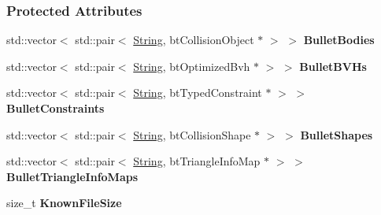 \subsubsection*{Protected Attributes}
\begin{DoxyCompactItemize}
\item 
\hypertarget{classphys_1_1internal_1_1BulletFile_aa06c20e012deb7f7cae320d97104334e}{
std::vector$<$ std::pair$<$ \hyperlink{namespacephys_aa03900411993de7fbfec4789bc1d392e}{String}, btCollisionObject $\ast$ $>$ $>$ {\bfseries BulletBodies}}
\label{classphys_1_1internal_1_1BulletFile_aa06c20e012deb7f7cae320d97104334e}

\item 
\hypertarget{classphys_1_1internal_1_1BulletFile_a6effca8b3d75b4253e1fa2f9557d381a}{
std::vector$<$ std::pair$<$ \hyperlink{namespacephys_aa03900411993de7fbfec4789bc1d392e}{String}, btOptimizedBvh $\ast$ $>$ $>$ {\bfseries BulletBVHs}}
\label{classphys_1_1internal_1_1BulletFile_a6effca8b3d75b4253e1fa2f9557d381a}

\item 
\hypertarget{classphys_1_1internal_1_1BulletFile_a9735286a72dcdc0885d72db07e2ba3a0}{
std::vector$<$ std::pair$<$ \hyperlink{namespacephys_aa03900411993de7fbfec4789bc1d392e}{String}, btTypedConstraint $\ast$ $>$ $>$ {\bfseries BulletConstraints}}
\label{classphys_1_1internal_1_1BulletFile_a9735286a72dcdc0885d72db07e2ba3a0}

\item 
\hypertarget{classphys_1_1internal_1_1BulletFile_a27074c0ada2979754653110d53c70d8f}{
std::vector$<$ std::pair$<$ \hyperlink{namespacephys_aa03900411993de7fbfec4789bc1d392e}{String}, btCollisionShape $\ast$ $>$ $>$ {\bfseries BulletShapes}}
\label{classphys_1_1internal_1_1BulletFile_a27074c0ada2979754653110d53c70d8f}

\item 
\hypertarget{classphys_1_1internal_1_1BulletFile_ae5f52ca26360b6f1143a46999255b6f2}{
std::vector$<$ std::pair$<$ \hyperlink{namespacephys_aa03900411993de7fbfec4789bc1d392e}{String}, btTriangleInfoMap $\ast$ $>$ $>$ {\bfseries BulletTriangleInfoMaps}}
\label{classphys_1_1internal_1_1BulletFile_ae5f52ca26360b6f1143a46999255b6f2}

\item 
\hypertarget{classphys_1_1internal_1_1BulletFile_acc5d2fad35f5de8285d2718ef4810f6c}{
size\_\-t {\bfseries KnownFileSize}}
\label{classphys_1_1internal_1_1BulletFile_acc5d2fad35f5de8285d2718ef4810f6c}

\end{DoxyCompactItemize}


